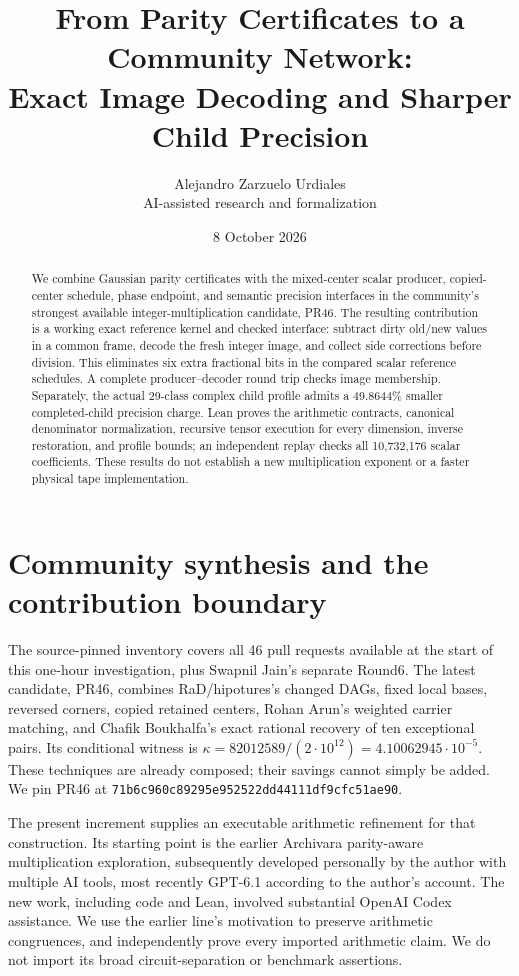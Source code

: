 \documentclass[11pt,a4paper]{article}
\title{From Parity Certificates to a Community Network:\\Exact Image Decoding and Sharper Child Precision}
\author{Alejandro Zarzuelo Urdiales\\\small AI-assisted research and formalization}
\date{8 October 2026}
\begin{document}
\maketitle
\begin{abstract}
We combine Gaussian parity certificates with the mixed-center scalar producer,
copied-center schedule, phase endpoint, and semantic precision interfaces in
the community's strongest available integer-multiplication candidate, PR46.
The resulting contribution is a working exact reference kernel and checked
interface: subtract dirty old/new values in a common frame, decode the fresh
integer image, and collect side corrections before division. This eliminates
six extra fractional bits in the compared scalar reference schedules. A
complete producer--decoder round trip checks image membership. Separately,
the actual 29-class complex child profile admits a 49.8644\% smaller
completed-child precision charge. Lean proves the arithmetic contracts,
canonical denominator normalization, recursive tensor execution for every
dimension, inverse restoration, and profile bounds;
an independent replay checks all 10,732,176 scalar coefficients. These results
do not establish a new multiplication exponent or a faster physical tape
implementation.
\end{abstract}

\section{Community synthesis and the contribution boundary}
The source-pinned inventory covers all 46 pull requests available at the
start of this one-hour investigation, plus Swapnil Jain's separate Round6.
The latest candidate, PR46, combines RaD/hipotures's changed DAGs, fixed local
bases, reversed corners, copied retained centers, Rohan Arun's weighted
carrier matching, and Chafik Boukhalfa's exact rational recovery of ten
exceptional pairs. Its conditional witness is
$\kappa=82012589/(2\cdot10^{12})=4.10062945\cdot10^{-5}$.
These techniques are already composed; their savings cannot simply be added.
We pin PR46 at \texttt{71b6c960c89295e952522dd44111df9cfc51ae90}.

The present increment supplies an executable arithmetic refinement for that
construction. Its starting point is the earlier Archivara parity-aware
multiplication exploration, subsequently developed personally by the author
with multiple AI tools, most recently GPT-6.1 according to the author's
account. The new work, including code and Lean, involved substantial OpenAI
Codex assistance. We use the earlier line's motivation to preserve arithmetic
congruences, and independently prove every imported arithmetic claim. We do
not import its broad circuit-separation or benchmark assertions.
\end{document}

